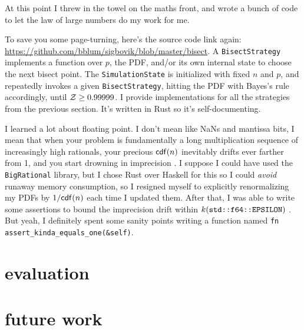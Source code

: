 \documentclass[11pt]{sigplanconf}
\begin{document}
At this point I threw in the towel on the maths front,
and wrote a bunch of code to let the law of large numbers do my work for me.

To save you some page-turning, here's the source code link again:
\url{https://github.com/bblum/sigbovik/blob/master/bisect}.
A {\tt BisectStrategy}
implements a function over $p$, the PDF, and/or its own internal state
to choose the next bisect point.
The {\tt SimulationState} is initialized with fixed $n$ and $p$,
and repeatedly invokes a given {\tt BisectStrategy},
hitting the PDF with Bayes's rule accordingly,
until $\mathcal{Z} \ge 0.99999$.
I provide implementations for all the strategies from the previous section.
It's written in Rust so it's self-documenting.

I learned a lot about floating point.
I don't mean like NaNs and mantissa bits,
I mean that when your problem is fundamentally a long multiplication sequence of increasingly high rationals,
your precious $\mathsf{cdf}(n)$ inevitably drifts ever farther from 1, and you start drowning in imprecision \cite{drowningpoint}.
I suppose I could have used the {\tt BigRational} library,
but I chose Rust over Haskell for this so I could {\it avoid} runaway memory consumption,
so I resigned myself to explicitly renormalizing my PDFs by $1/\mathsf{cdf}(n)$ each time I updated them.
After that, I was able to write some assertions
to bound the imprecision drift within $k(\text{\tt std::f64::EPSILON})$ \cite{epsilon}.
But yeah, I definitely spent some sanity points writing a function named {\tt fn assert\_kinda\_equals\_one(\&self)}.



\section{evaluation}




\section{future work}
\end{document}
